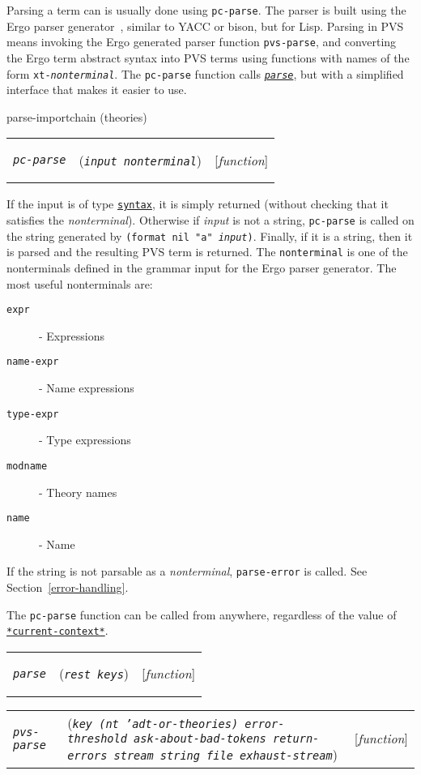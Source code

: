 \documentclass[12pt]{book}
\makeatletter
\def\tilde{\symbol{'176}}
\def\amprest{{\smaller\sc {\smaller\smaller \&}rest\ }}
\def\ampkey{{\smaller\sc {\smaller\smaller \&}key\ }}
\newenvironment{function}[3]%
{\par\noindent\begin{boxedminipage}{\textwidth}%
 \par\noindent\begin{tabularx}{\linewidth}{l>{\raggedright}Xr}%
 \functionhtgt{#1}&(\texttt{\textit{#2}})&[\emph{#3}]%
 \end{tabularx}\par\flushright\begin{minipage}{.97\textwidth}}
{\end{minipage}\end{boxedminipage}}
\newcommand{\functionnm}[1]{\texttt{\textit{#1}}}
\newcommand{\functionhln}[1]{\hyperlink{#1}{\functionnm{#1}}}
\newcommand{\functionhtgt}[1]{\hypertarget{#1}{\functionnm{#1}}\index{#1@\functionnm{#1}|underline}}
\newenvironment{lispfunction}[2]%
{\begin{function}{#1}{#2}{function}}{\end{function}}
\newcommand{\classnm}[1]{\texttt{\textup{#1}}}
\newcommand{\classhln}[1]{\hyperlink{#1}{\classnm{#1}}}
\newcommand{\globalnm}[1]{\texttt{\textup{#1}}}
\newcommand{\globalhln}[1]{\hyperlink{#1}{\globalnm{#1}}}
\makeatother
\begin{document}
Parsing a term can is usually done using \texttt{pc-parse}.  The
parser is built using the Ergo parser generator~\cite{ERGO}, similar to
YACC or bison, but for Lisp.  Parsing in PVS means invoking the Ergo
generated parser function \texttt{pvs-parse}, and converting the Ergo term
abstract syntax into PVS terms using functions with names of the form
\texttt{xt-\textit{nonterminal}}.  The \texttt{pc-parse} function calls
\functionhln{parse}, but with a simplified interface that makes it easier to
use.

parse-importchain (theories)

\begin{lispfunction}{pc-parse}{input nonterminal}
If the input is of type \classhln{syntax}, it is simply returned (without
checking that it satisfies the \textit{nonterminal}).  Otherwise if
\textit{input} is not a string, \texttt{pc-parse} is called on the string
generated by \texttt{(format nil "\tilde a" \textit{input})}.  Finally, if
it is a string, then it is parsed and the resulting PVS term is returned.
The \texttt{nonterminal} is one of the nonterminals defined in the grammar
input for the Ergo parser generator.  The most useful nonterminals are:
\begin{description}
\item[\texttt{expr}] - Expressions
\item[\texttt{name-expr}] - Name expressions
\item[\texttt{type-expr}] - Type expressions
\item[\texttt{modname}] - Theory names
\item[\texttt{name}] - Name
\end{description}

If the string is not parsable as a \textit{nonterminal},
\texttt{parse-error} is called.  See Section~\ref{error-handling}.

The \texttt{pc-parse} function can be called from anywhere, regardless of
the value of \globalhln{*current-context*}.

\end{lispfunction}

\begin{lispfunction}{parse}{\amprest keys}
\end{lispfunction}

\begin{lispfunction}{pvs-parse}
{\ampkey \textup{(}nt \textup{'adt-or-theories}\textup{)} error-threshold
   ask-about-bad-tokens return-errors stream string file exhaust-stream}

\end{lispfunction}
\end{document}
